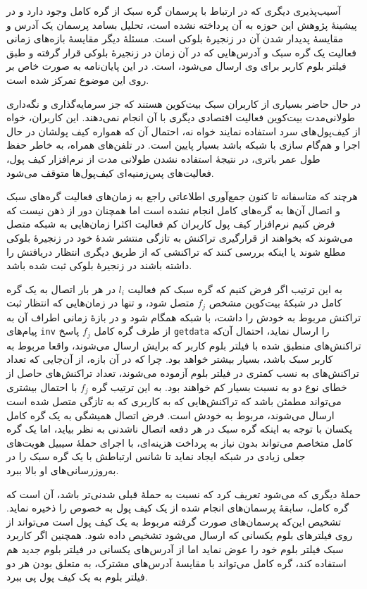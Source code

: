 آسیب‌پذیری دیگری که در ارتباط با پرسمان‌ گره سبک از گره کامل وجود دارد و در پیشینهٔ پژوهش این حوزه به آن پرداخته نشده است، تحلیل بسامد پرسمان یک آدرس  و مقایسهٔ پدیدار شدن آن در زنجیرهٔ بلوکی است. مسئلهٔ دیگر مقایسهٔ بازه‌های زمانی فعالیت یک گره سبک و آدرس‌هایی که در آن زمان در زنجیرهٔ بلوکی قرار گرفته و طبق فیلتر بلوم کاربر برای وی ارسال می‌شود، است. در این پایان‌نامه به صورت خاص بر روی این موضوع تمرکز شده است. 

در حال حاضر بسیاری از کاربران سبک بیت‌کوین هستند که جز سرمایه‌گذاری و نگه‌داری طولانی‌مدت بیت‌کوین فعالیت اقتصادی دیگری با آن انجام نمی‌دهند. این کاربران، خواه از کیف‌پول‌های سرد استفاده نمایند خواه نه، احتمال آن که همواره کیف پولشان در حال اجرا و هم‌گام سازی با شبکه باشد بسیار پایین است. در تلفن‌های همراه، به خاطر حفظ طول عمر باتری، در نتیجهٔ استفاده نشدن طولانی مدت از نرم‌افزار کیف پول، فعالیت‌‌های پس‌زمنیه‌‌ای کیف‌پول‌ها متوقف می‌شود.  

هرچند که متاسفانه تا کنون جمع‌آوری اطلاعاتی راجع به زمان‌های فعالیت گره‌های سبک و اتصال آن‌ها به گره‌های کامل انجام نشده است اما همچنان دور از ذهن نیست که فرض کنیم نرم‌افزار کیف پول کاربران کم فعالیت اکثرا زمان‌هایی به شبکه متصل می‌شوند که بخواهند از قرارگیری تراکنش به تازگی منتشر شدهٔ خود در زنجیرهٔ بلوکی مطلع شوند یا اینکه بررسی کنند که تراکنشی که از طریق دیگری انتظار دریافتش را داشته باشند در زنجیرهٔ بلوکی ثبت شده باشد. 

به این ترتیب اگر فرض کنیم که گره سبک کم فعالیت $l_i$ در هر بار اتصال به یک گره کامل در شبکهٔ بیت‌کوین مشخص $f_j$ متصل شود، و تنها در زمان‌هایی که انتظار ثبت تراکنش مربوط به خودش را داشت، با شبکه همگام شود و در بازهٔ زمانی اطراف آن به پیام‌های \texttt{inv} از طرف گره کامل $f_j$ پاسخ‌ \texttt{getdata} را ارسال نماید، احتمال آن‌که تراکنش‌های منطبق شده با فیلتر بلوم کاربر که برایش ارسال می‌شوند، واقعا مربوط به کاربر سبک باشد، بسیار بیشتر خواهد بود. چرا که در آن بازه، از آن‌جایی که  تعداد تراکنش‌های به نسب کمتری در فیلتر بلوم آزموده می‌شوند،‌ تعداد تراکنش‌های حاصل از خطای نوع دو به نسبت بسیار کم خواهند بود. به این ترتیب گره $f_j$ با احتمال بیشتری می‌تواند مطمئن باشد که تراکنش‌هایی که به کاربری که به تازگی متصل شده است ارسال می‌شوند، مربوط به خودش است. فرض اتصال همیشگی به یک گره کامل یکسان با توجه به اینکه گره سبک در هر دفعه اتصال ناشدنی به نظر بیاید، اما یک گره کامل متخاصم می‌تواند بدون نیاز به پرداخت هزینه‌ای، با اجرای 
حملهٔ سیبیل
هویت‌های جعلی زیادی در شبکه ایجاد نماید تا شانس ارتباطش با یک گره سبک را در به‌روزرسانی‌های او بالا ببرد.

حملهٔ دیگری که می‌شود تعریف کرد که نسبت به حملهٔ قبلی شدنی‌تر باشد، آن است که گره کامل، سابقهٔ پرسمان‌های انجام شده از یک کیف پول به خصوص را ذخیره نماید. تشخیص این‌که پرسمان‌های صورت گرفته مربوط به یک کیف پول است می‌تواند از روی فیلتر‌های بلوم یکسانی که ارسال می‌شود تشخیص داده شود. همچنین اگر کاربرد سبک فیلتر بلوم خود را عوض نماید اما از آدرس‌های یکسانی در فیلتر بلوم جدید هم استفاده کند،‌ گره کامل می‌تواند با مقایسهٔ آدرس‌های مشترک، به متعلق بودن هر دو فیلتر بلوم به یک کیف پول پی ببرد.

